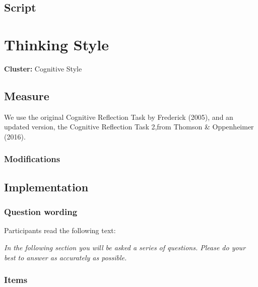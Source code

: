 \documentclass[
  letterpaper,
]{scrbook}
\begin{document}
\section{Script}\label{script-1}

\chapter{Thinking Style}\label{thinking-style}

\textbf{Cluster:} Cognitive Style

\section{Measure}\label{measure-14}

We use the original Cognitive Reflection Task by Frederick (2005), and
an updated version, the Cognitive Reflection Task 2,from Thomson \&
Oppenheimer (2016).

\subsection*{Modifications}\label{modifications-12}

\section{Implementation}\label{implementation-14}

\subsection*{Question wording}\label{question-wording-14}

Participants read the following text:

\emph{In the following section you will be asked a series of questions.
Please do your best to answer as accurately as possible.}

\subsection*{Items}\label{items-14}
\end{document}
